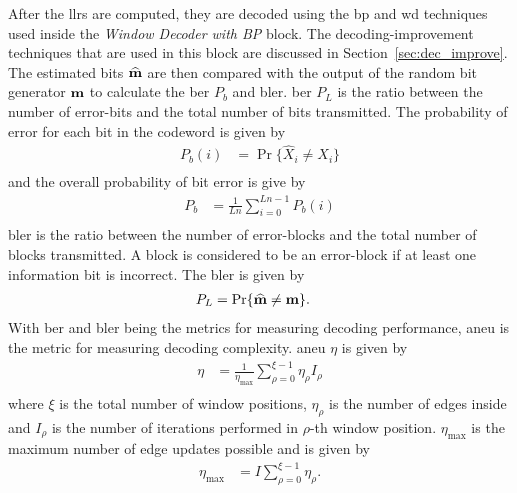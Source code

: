 After the \acp{llr} are computed, they are decoded using the \ac{bp} and \ac{wd} techniques used inside the \emph{Window Decoder with BP} block. The decoding-improvement techniques that are used in this block are discussed in Section~\ref{sec:dec_improve}. The estimated bits $\widehat{\mathbf{m}}$ are then compared with the output of the random bit generator $\mathbf{m}$ to calculate the \ac{ber} $P_b$ and \ac{bler}. \ac{ber} $P_L$ is the ratio between the number of error-bits and the total number of bits transmitted. The probability of error for each bit in the codeword is given by
\begin{align}
P_b(i)&=\Pr\{\widehat{X}_i\neq X_i\}\\
\end{align}
and the overall probability of bit error is give by
\begin{align}
P_b&=\frac{1}{Ln}\sum_{i=0}^{Ln-1}P_b(i)\\
\end{align}
\ac{bler} is the ratio between the number of error-blocks and the total number of blocks transmitted. A block is considered to be an error-block if at least one information bit is incorrect. The \ac{bler} is given by
\begin{align}
P_L&=\Pr\{\widehat{\mathbf{m}}\neq \mathbf{m}\}.
\end{align}
With \ac{ber} and \ac{bler} being the metrics for measuring decoding performance, \ac{aneu} is the metric for measuring decoding complexity. \ac{aneu} $\eta$ is given by
\begin{align}
\eta&=\frac{1}{\eta_{\text{max}}}\sum_{\rho=0}^{\xi-1}\eta_\rho I_\rho\\
\end{align}
where $\xi$ is the total number of window positions, $\eta_\rho$ is the number of edges inside and $I_\rho$ is the number of iterations performed in $\rho$-th window position. $\eta_{\text{max}}$ is the maximum number of edge updates possible and is given by
\begin{align}
\eta_{\text{max}}&=I\sum_{\rho=0}^{\xi-1}\eta_\rho.
\end{align}